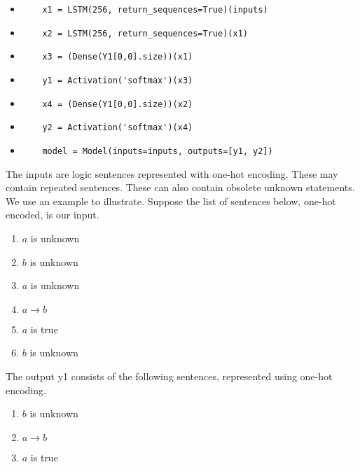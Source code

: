 \documentclass{article}
\begin{document}
\begin{itemize}
\item
  \begin{verbatim}
    x1 = LSTM(256, return_sequences=True)(inputs)
  \end{verbatim}
\item
  \begin{verbatim}
    x2 = LSTM(256, return_sequences=True)(x1)
  \end{verbatim}
\item
  \begin{verbatim}
    x3 = (Dense(Y1[0,0].size))(x1)
  \end{verbatim}
\item
  \begin{verbatim}
    y1 = Activation('softmax')(x3)
  \end{verbatim}
\item
  \begin{verbatim}
    x4 = (Dense(Y1[0,0].size))(x2)
  \end{verbatim}
\item
  \begin{verbatim}
    y2 = Activation('softmax')(x4)
  \end{verbatim}
\item
  \begin{verbatim}
    model = Model(inputs=inputs, outputs=[y1, y2])
  \end{verbatim}
\end{itemize}

The inputs are logic sentences represented with one-hot encoding.
These may contain repeated sentences.  These can also contain
obsolete unknown statements.  We use an example to illustrate.
Suppose the list of sentences below, one-hot encoded, is our input.

\begin{enumerate}
\item $a$ is unknown
\item $b$ is unknown
\item $a$ is unknown
\item $a \rightarrow b$
\item $a$ is true
\item $b$ is unknown
\end{enumerate}

The output y1 consists of the following sentences, represented
using one-hot encoding.

\begin{enumerate}
\item $b$ is unknown
\item $a \rightarrow b$
\item $a$ is true
\end{enumerate}
\end{document}
